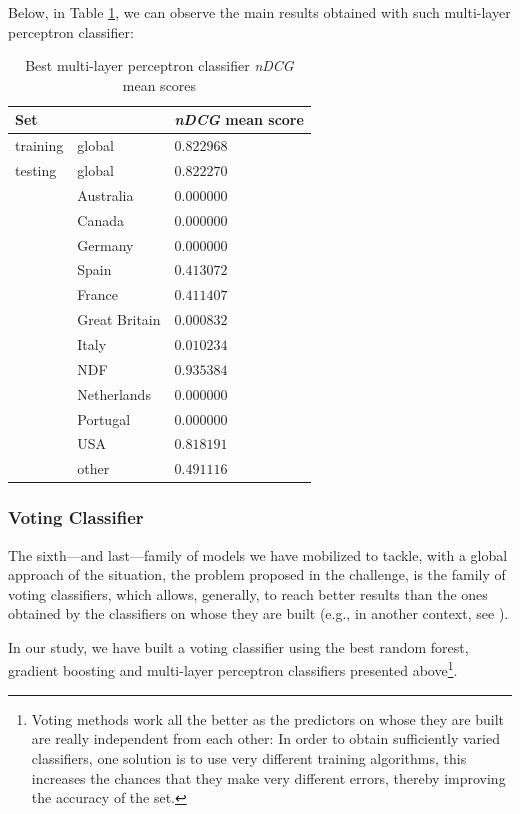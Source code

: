 \documentclass[twocolumn, switch]{article}
\begin{document}
Below, in Table \ref{tab:mlpc}, we can observe the main results obtained with such multi-layer perceptron classifier:

\begin{table}[H]
\caption{Best multi-layer perceptron classifier \textit{nDCG} mean scores}
\centering
\begin{tabular}{lll}
\toprule
Set & & \textit{nDCG} mean score \\
\midrule
training & global & $0.822968$ \\
testing & global & $0.822270$ \\
& Australia & $0.000000$ \\
& Canada & $0.000000$ \\
& Germany & $0.000000$ \\
& Spain & $0.413072$ \\
& France & $0.411407$ \\
& Great Britain & $0.000832$ \\
& Italy & $0.010234$ \\
& NDF & $0.935384$ \\
& Netherlands & $0.000000$ \\
& Portugal & $0.000000$ \\
& USA & $0.818191$ \\
& other & $0.491116$ \\
\bottomrule
\end{tabular}
\label{tab:mlpc}
\end{table}

\subsubsection{Voting Classifier}

The sixth---and last---family of models we have mobilized to tackle, with a global approach of the situation, the problem proposed in the challenge, is the family of voting classifiers, which allows, generally, to reach better results than the ones obtained by the classifiers on whose they are built (e.g., in another context, see \cite{VanHalteren_1998}).

In our study, we have built a voting classifier using the best random forest, gradient boosting and multi-layer perceptron classifiers presented above\footnote{Voting methods work all the better as the predictors on whose they are built are really independent from each other: In order to obtain sufficiently varied classifiers, one solution is to use very different training algorithms, this increases the chances that they make very different errors, thereby improving the accuracy of the set.}.
\end{document}

